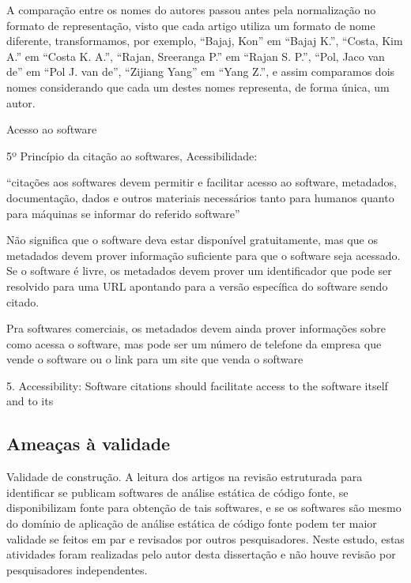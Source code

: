 A comparação entre os nomes do autores passou antes pela normalização
no formato de representação, visto que cada artigo utiliza um formato
de nome diferente, transformamos, por exemplo, ``Bajaj, Kon'' em ``Bajaj K.'',
``Costa, Kim A.'' em ``Costa K. A.'', ``Rajan, Sreeranga P.'' em ``Rajan S. P.'',
``Pol, Jaco van de'' em ``Pol J. van de'', ``Zijiang Yang'' em ``Yang Z.'',
e assim comparamos dois nomes considerando que cada um destes nomes representa,
de forma única, um autor.

Acesso ao software

5º Princípio da citação ao softwares, Acessibilidade:

``citações aos softwares devem permitir e facilitar acesso ao software,
metadados, documentação, dados e outros materiais necessários tanto
para humanos quanto para máquinas se informar do referido software''

Não significa que o software deva estar disponível gratuitamente, mas que
os metadados devem prover informação suficiente para que o software seja
acessado. Se o software é livre, os metadados devem prover um identificador
que pode ser resolvido para uma URL apontando para a versão específica
do software sendo citado.

Pra softwares comerciais, os metadados devem ainda prover informações sobre
como acessa o software, mas pode ser um número de telefone da empresa que
vende o software ou o link para um site que venda o software

\cite{smith2016software}

5. Accessibility: Software citations should facilitate access to the software itself and to its


\subsection{Ameaças à validade}

Validade de construção.
A leitura dos artigos na revisão estruturada para identificar se publicam
softwares de análise estática de código fonte, se disponibilizam fonte para
obtenção de tais softwares, e se os softwares são mesmo do domínio de aplicação
de análise estática de código fonte podem ter maior validade se feitos em
par e revisados por outros pesquisadores.
Neste estudo, estas atividades foram realizadas pelo autor desta dissertação e 
não houve revisão por pesquisadores independentes.

